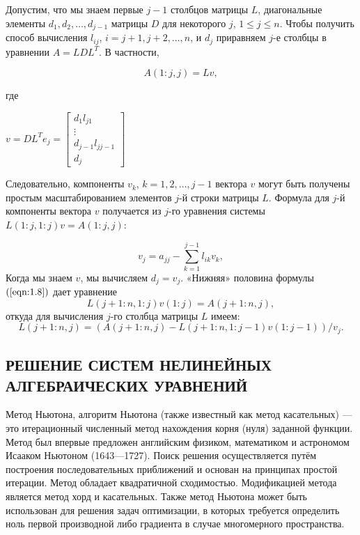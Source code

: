 \documentclass[a4paper]{article}
\begin{document}
Допустим, что мы знаем первые \(j-1\) столбцов матрицы \(L\),
диагональные элементы \(d_1, d_2, \ldots, d_{j-1}\) матрицы \(D\) для
некоторого \(j\), \(1 \leq j \leq n\). Чтобы получить способ вычисления
\(l_{ij}\), \(i = j+1, j+2, \ldots, n\), и \(d_j\) приравняем \(j\)-е
столбцы в уравнении \(A = LDL^T\). В частности,

\begin{equation}
    \label{eqn:1.8}
    A(1:j,j) = Lv,
\end{equation}

где
\begin{center}
 $v = DL^T e_j = \begin{bmatrix}
   d_1 l_{j1}\\
   \vdots \\
   d_{j-1} l_{jj-1}\\
   d_j
   \end{bmatrix}$
\end{center}

Следовательно, компоненты \(v_k\), \(k = 1, 2, \ldots, j-1\) вектора
\(v\) могут быть получены простым масштабированием элементов \(j\)-й
строки матрицы \(L\). Формула для \(j\)-й компоненты вектора \(v\)
получается из \(j\)-го уравнения системы \(L(1:j, 1:j) v = A(1:j, j)\):

\[
   v_j = a_{jj} - \sum_{k = 1}^{j-1} l_{ik}v_k,
\] Когда мы знаем \(v\), мы вычисляем \(d_j = v_j\). «Нижняя» половина
формулы $(\ref{eqn:1.8})$ дает уравнение \[
   L(j+1:n, 1:j) v(1:j) = A(j+1:n, j),
\] откуда для вычисления \(j\)-го столбца матрицы \(L\) имеем: \[
   L(j+1:n, j) = (A(j+1:n,j) - L(j+1:n, 1:j-1)v(1:j-1))/v_j.
\]

\newpage

\begin{center}
 \section{РЕШЕНИЕ СИСТЕМ НЕЛИНЕЙНЫХ АЛГЕБРАИЧЕСКИХ УРАВНЕНИЙ}
\end{center}

Метод Ньютона, алгоритм Ньютона (также известный как метод касательных) — это итерационный численный метод нахождения корня (нуля) заданной функции. Метод был впервые предложен английским физиком, математиком и астрономом Исааком Ньютоном (1643—1727). Поиск решения осуществляется путём построения последовательных приближений и основан на принципах простой итерации. Метод обладает квадратичной сходимостью. Модификацией метода является метод хорд и касательных. Также метод Ньютона может быть использован для решения задач оптимизации, в которых требуется определить ноль первой производной либо градиента в случае многомерного пространства.
\end{document}
